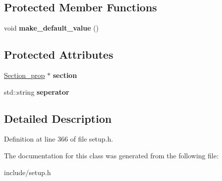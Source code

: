 \subsection*{Protected Member Functions}
\begin{DoxyCompactItemize}
\item 
\hypertarget{classProp__multival_a0a894a156a00f00d82f119a415619498}{void {\bfseries make\-\_\-default\-\_\-value} ()}\label{classProp__multival_a0a894a156a00f00d82f119a415619498}

\end{DoxyCompactItemize}
\subsection*{Protected Attributes}
\begin{DoxyCompactItemize}
\item 
\hypertarget{classProp__multival_a81ace37ba9062aea3513ddb30ccba50d}{\hyperlink{classSection__prop}{Section\-\_\-prop} $\ast$ {\bfseries section}}\label{classProp__multival_a81ace37ba9062aea3513ddb30ccba50d}

\item 
\hypertarget{classProp__multival_a507b96adb6fb9aafdec560cacff2d2ad}{std\-::string {\bfseries seperator}}\label{classProp__multival_a507b96adb6fb9aafdec560cacff2d2ad}

\end{DoxyCompactItemize}


\subsection{Detailed Description}


Definition at line 366 of file setup.\-h.



The documentation for this class was generated from the following file\-:\begin{DoxyCompactItemize}
\item 
include/setup.\-h\end{DoxyCompactItemize}
